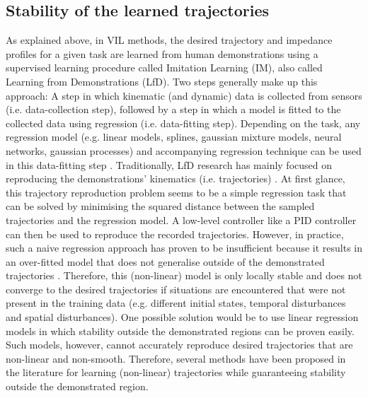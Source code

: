 \subsection{Stability of the learned trajectories}




As explained above, in VIL methods, the desired trajectory and impedance profiles for a given task are learned from human demonstrations using a supervised learning procedure called Imitation Learning (IM), also called Learning from Demonstrations (LfD). Two steps generally make up this approach: A step in which kinematic (and dynamic) data is collected from sensors (i.e. data-collection step), followed by a step in which a model is fitted to the collected data using regression (i.e. data-fitting step). Depending on the task, any regression model (e.g. linear models, splines, gaussian mixture models, neural networks, gaussian processes) and accompanying regression technique can be used in this data-fitting step \cite{kroemerReviewRobotLearning2021,husseinImitationLearningSurvey2017}. Traditionally, LfD research has mainly focused on reproducing the demonstrations' kinematics (i.e. trajectories) \cite{siReviewManipulationSkill2021}. At first glance, this trajectory reproduction problem seems to be a simple regression task that can be solved by minimising the squared distance between the sampled trajectories and the regression model. A low-level controller like a PID controller can then be used to reproduce the recorded trajectories. However, in practice, such a naive regression approach has proven to be insufficient because it results in an over-fitted model that does not generalise outside of the demonstrated trajectories \cite{sindhwaniLearningContractingVector2018}. Therefore, this (non-linear) model is only locally stable and does not converge to the desired trajectories if situations are encountered that were not present in the training data (e.g. different initial states, temporal disturbances and spatial disturbances). One possible solution would be to use linear regression models in which stability outside the demonstrated regions can be proven easily. Such models, however, cannot accurately reproduce desired trajectories that are non-linear and non-smooth. Therefore, several methods have been proposed in the literature for learning (non-linear) trajectories while guaranteeing stability outside the demonstrated region.

